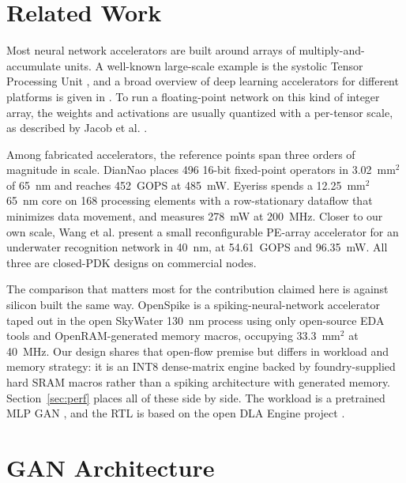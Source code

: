 \documentclass[conference,a4paper]{APSIPA2026}
\begin{document}
\section{Related Work}
Most neural network accelerators are built around arrays of multiply-and-accumulate units. A well-known large-scale example is the systolic Tensor Processing Unit \cite{tpu}, and a broad overview of deep learning accelerators for different platforms is given in \cite{survey}. To run a floating-point network on this kind of integer array, the weights and activations are usually quantized with a per-tensor scale, as described by Jacob et al. \cite{jacob}.

Among fabricated accelerators, the reference points span three orders of magnitude in scale. DianNao \cite{diannao} places 496 16-bit fixed-point operators in 3.02~mm$^2$ of 65~nm and reaches 452~GOPS at 485~mW. Eyeriss \cite{eyeriss} spends a 12.25~mm$^2$ 65~nm core on 168 processing elements with a row-stationary dataflow that minimizes data movement, and measures 278~mW at 200~MHz. Closer to our own scale, Wang et al. \cite{wang} present a small reconfigurable PE-array accelerator for an underwater recognition network in 40~nm, at 54.61~GOPS and 96.35~mW. All three are closed-PDK designs on commercial nodes.

The comparison that matters most for the contribution claimed here is against silicon built the same way. OpenSpike \cite{openspike} is a spiking-neural-network accelerator taped out in the open SkyWater 130~nm process using only open-source EDA tools and OpenRAM-generated memory macros, occupying 33.3~mm$^2$ at 40~MHz. Our design shares that open-flow premise but differs in workload and memory strategy: it is an INT8 dense-matrix engine backed by foundry-supplied hard SRAM macros rather than a spiking architecture with generated memory. Section~\ref{sec:perf} places all of these side by side. The workload is a pretrained MLP GAN \cite{goodfellow, ganpretrained}, and the RTL is based on the open DLA Engine project \cite{dlaengine}.

\section{GAN Architecture}\label{sec:overview}
\end{document}
